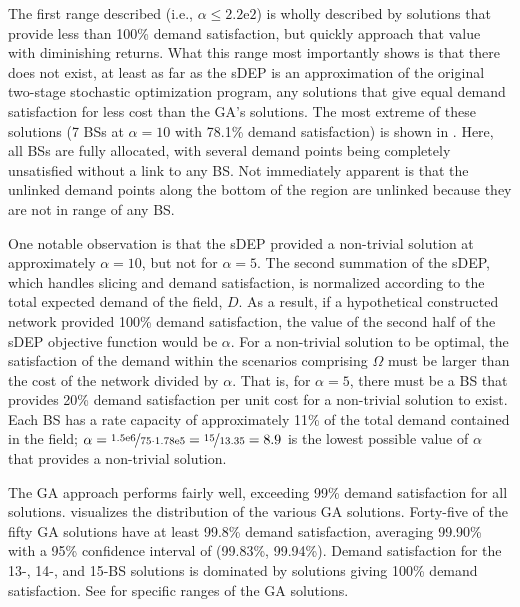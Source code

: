 \documentclass[12pt,dvipsnames]{report}
\newcommand{\expnumber}[2]{{#1}\mathrm{e}{#2}}
\begin{document}
The first range described (i.e., $\alpha \leq \expnumber{2.2}{2}$) is wholly described by solutions that provide less than 100\% demand satisfaction, but quickly approach that value with diminishing returns.  What this range most importantly shows is that there does not exist, at least as far as the sDEP is an approximation of the original two-stage stochastic optimization program, any solutions that give equal demand satisfaction for less cost than the GA's solutions. The most extreme of these solutions (7 BSs at $\alpha = 10$ with 78.1\% demand satisfaction) is shown in .  Here, all BSs are fully allocated, with several demand points being completely unsatisfied without a link to any BS.  Not immediately apparent is that the unlinked demand points along the bottom of the region are unlinked because they are not in range of any BS.

One notable observation is that the sDEP provided a non-trivial solution at approximately $\alpha = 10$, but not for $\alpha = 5$.  The second summation of the sDEP, which handles slicing and demand satisfaction, is normalized according to the total expected demand of the field, $D$.  As a result, if a hypothetical constructed network provided 100\% demand satisfaction, the value of the second half of the sDEP objective function would be $\alpha$.  For a non-trivial solution to be optimal, the satisfaction of the demand within the scenarios comprising $\Omega$ must be larger than the cost of the network divided by $\alpha$.  That is, for $\alpha = 5$, there must be a BS that provides 20\% demand satisfaction per unit cost for a non-trivial solution to exist.  Each BS has a rate capacity of approximately 11\% of the total demand contained in the field; $\alpha = \nicefrac{\expnumber{1.5}{6}}{75 \cdot \expnumber{1.78}{5}} = \nicefrac{15}{13.35} = 8.9$ is the lowest possible value of $\alpha$ that provides a non-trivial solution.

The GA approach performs fairly well, exceeding 99\% demand satisfaction for all solutions.   visualizes the distribution of the various GA solutions.  Forty-five of the fifty GA solutions have at least 99.8\% demand satisfaction, averaging 99.90\% with a 95\% confidence interval of (99.83\%, 99.94\%).  Demand satisfaction for the 13-, 14-, and 15-BS solutions is dominated by solutions giving 100\% demand satisfaction.  See  for specific ranges of the GA solutions.
\end{document}
